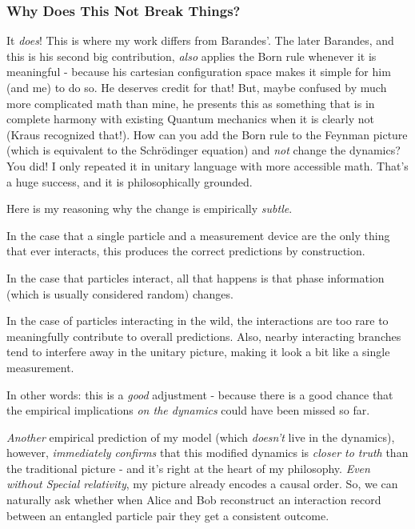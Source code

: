 \documentclass{article}
\begin{document}
\subsubsection{Why Does This Not Break Things?}

It \textit{does}! This is where my work differs from Barandes'. The later Barandes, and this is his second big contribution, \textit{also} applies the Born rule whenever it is meaningful - because his cartesian configuration space makes it simple for him (and me) to do so. He deserves credit for that! But, maybe confused by much more complicated math than mine, he presents this as something that is in complete harmony with existing Quantum mechanics when it is clearly not (Kraus recognized that!). How can you add the Born rule to the Feynman picture (which is equivalent to the Schrödinger equation) and \textit{not} change the dynamics? You did! I only repeated it in unitary language with more accessible math. That's a huge success, and it is philosophically grounded.

Here is my reasoning why the change is empirically \textit{subtle}.

In the case that a single particle and a measurement device are the only thing that ever interacts, this produces the correct predictions by construction.

In the case that particles interact, all that happens is that phase information (which is usually considered random) changes.

In the case of particles interacting in the wild, the interactions are too rare to meaningfully contribute to overall predictions. Also, nearby interacting branches tend to interfere away in the unitary picture, making it look a bit like a single measurement.

In other words: this is a \textit{good} adjustment - because there is a good chance that the empirical implications \textit{on the dynamics} could have been missed so far.

\textit{Another} empirical prediction of my model (which \textit{doesn't} live in the dynamics), however, \textit{immediately confirms} that this modified dynamics is \textit{closer to truth} than the traditional picture - and it's right at the heart of my philosophy. \textit{Even without Special relativity}, my picture already encodes a causal order. So, we can naturally ask whether when Alice and Bob reconstruct an interaction record between an entangled particle pair they get a consistent outcome.
\end{document}
